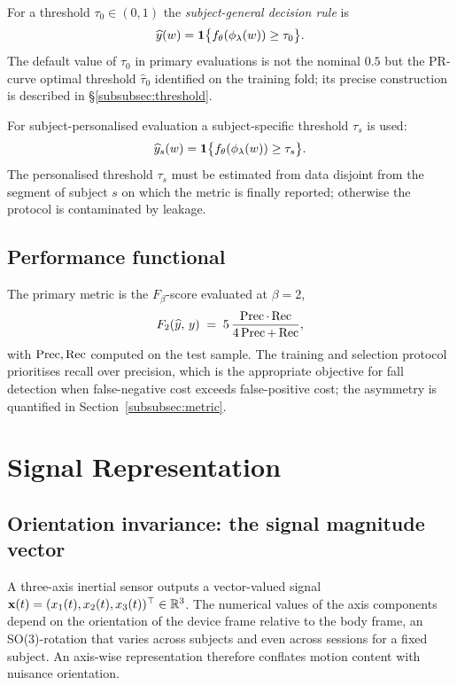 For a threshold $\tau_0\in(0,1)$ the \emph{subject-general decision rule} is
\begin{equation}
  \widehat y(w)=\mathbf{1}\bigl\{f_\theta(\phi_\lambda(w))\geq\tau_0\bigr\}.
  \label{eq:dec-general}
\end{equation}
The default value of $\tau_0$ in primary evaluations is not the nominal $0.5$ but the
PR-curve optimal threshold $\hat\tau_0$ identified on the training fold; its precise
construction is described in §\ref{subsubsec:threshold}.

For subject-personalised evaluation a subject-specific threshold $\tau_s$ is used:
\begin{equation}
  \widehat y_s(w)=\mathbf{1}\bigl\{f_\theta(\phi_\lambda(w))\geq\tau_s\bigr\}.
  \label{eq:dec-personal}
\end{equation}
The personalised threshold $\tau_s$ must be estimated from data disjoint from the segment of subject $s$ on which the metric is finally reported; otherwise the protocol is contaminated by leakage.

\subsection{Performance functional}

The primary metric is the $F_\beta$-score evaluated at $\beta=2$,
\begin{equation}
  F_2(\widehat y,\,y)\;=\;5\,\frac{\operatorname{Prec}\cdot\operatorname{Rec}}{4\operatorname{Prec}+\operatorname{Rec}},
  \label{eq:F2-def}
\end{equation}
with $\operatorname{Prec},\operatorname{Rec}$ computed on the test sample. The training and selection protocol prioritises recall over precision, which is the appropriate objective for fall detection when false-negative cost exceeds false-positive cost; the asymmetry is quantified in Section~\ref{subsubsec:metric}.

\section{Signal Representation}
\label{subsec:signal_rep}

\subsection{Orientation invariance: the signal magnitude vector}
\label{subsubsec:smv}

A three-axis inertial sensor outputs a vector-valued signal $\mathbf{x}(t)=(x_1(t),x_2(t),x_3(t))^\top\in\mathbb{R}^3$. The numerical values of the axis components depend on the orientation of the device frame relative to the body frame, an SO(3)-rotation that varies across subjects and even across sessions for a fixed subject. An axis-wise representation therefore conflates motion content with nuisance orientation.

